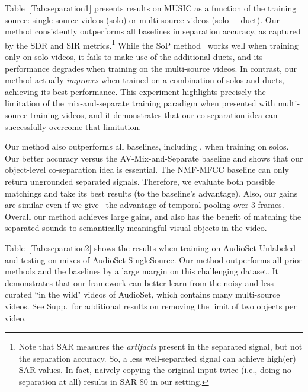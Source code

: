 \documentclass[10pt,twocolumn,letterpaper]{article}
\begin{document}
Table~\ref{Tab:separation1} presents results on MUSIC as a function of the training source: single-source videos (solo) or multi-source videos (solo + duet). Our method consistently outperforms all baselines in separation accuracy, as captured by the SDR and SIR metrics.\footnote{Note that SAR measures the \emph{artifacts} present in the separated signal, but not the separation accuracy. So, a less well-separated signal can achieve high(er) SAR values. In fact, naively copying the original input twice (i.e., doing no separation at all) results in SAR  80 in our setting.} While the SoP method~\cite{zhao2018sound} works well when training only on solo videos, it fails to make use of the additional duets, and its performance degrades when training on the multi-source videos. In contrast, our method actually \emph{improves} when trained on a combination of solos and duets, achieving its best performance. This experiment highlights precisely the limitation of the mix-and-separate training paradigm when presented with multi-source training videos, and it demonstrates that our co-separation idea can successfully overcome that limitation.

Our method also outperforms all baselines, including \cite{zhao2018sound}, when training on solos. Our better accuracy versus the AV-Mix-and-Separate baseline and \cite{zhao2018sound} shows that our object-level co-separation idea is essential. The NMF-MFCC baseline can only return ungrounded separated signals. Therefore, we evaluate both possible matchings and take its best results (to the baseline's advantage). Also, our gains are similar even if we give~\cite{zhao2018sound} the advantage of temporal pooling over 3 frames. Overall our method achieves large gains, and also has the benefit of matching the separated sounds to semantically meaningful visual objects in the video.


Table~\ref{Tab:separation2} shows the results when training on AudioSet-Unlabeled and testing on mixes of AudioSet-SingleSource. Our method outperforms all prior methods and the baselines by a large margin on this challenging dataset. It demonstrates that our framework can better learn from the noisy and less curated ``in the wild" videos of AudioSet, which contains many multi-source videos. See Supp.~for additional results on removing the limit of two objects per video.
\end{document}
